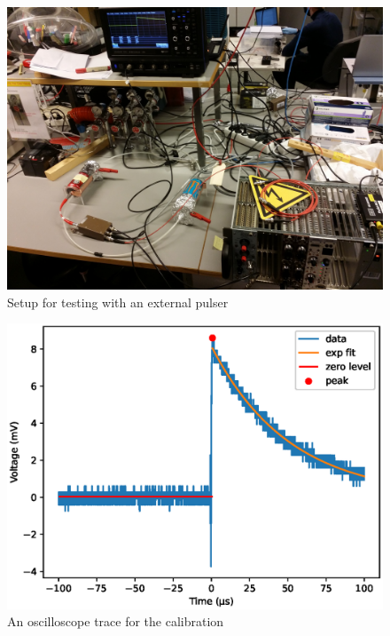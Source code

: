 \documentclass[a4paper]{article}
\begin{document}
\begin{figure}[ht!]
\centering
\includegraphics[width=\textwidth]{fig/IMG_20201130_135000.jpg}
\caption{Setup for testing with an external pulser}
\label{fig:pulser_setup}
\end{figure}

\begin{figure}[ht!]
\centering
\includegraphics[width=\textwidth]{fig/python/calibration_trace.eps}
\caption{An oscilloscope trace for the calibration}
\label{fig:cal_trace}
\end{figure}



\FloatBarrier
\end{document}
